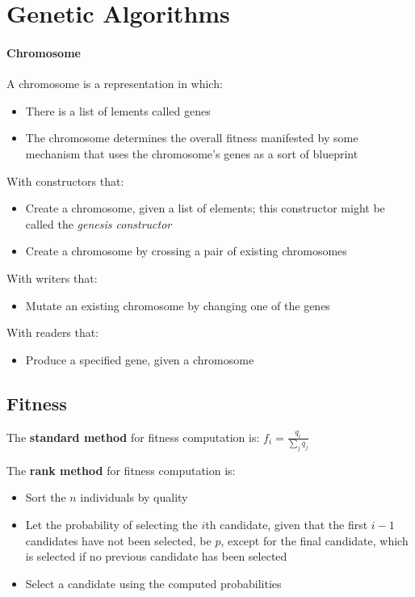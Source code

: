 \section{Genetic Algorithms}

\paragraph{Chromosome} A chromosome is a representation in which:
\begin{itemize}
  \item There is a list of lements called genes
  \item The chromosome determines the overall fitness manifested by
    some mechanism that uses the chromosome's genes as a sort of
    blueprint
\end{itemize}
With constructors that:
\begin{itemize}
  \item Create a chromosome, given a list of elements; this
    constructor might be called the \textit{genesis constructor}
  \item Create a chromosome by crossing a pair of existing
    chromosomes
\end{itemize}
With writers that:
\begin{itemize}
  \item Mutate an existing chromosome by changing one of the genes
\end{itemize}
With readers that:
\begin{itemize}
  \item Produce a specified gene, given a chromosome
\end{itemize}

\subsection{Fitness}

The \textbf{standard method} for fitness computation is:
\begin{math}
  f_i = \frac{q_i}{\sum_{j}{q_j}}
\end{math}

The \textbf{rank method} for fitness computation is:
\begin{itemize}
  \item Sort the $n$ individuals by quality
  \item Let the probability of selecting the $i$th candidate, given
    that the first $i-1$ candidates have not been selected, be $p$,
    except for the final candidate, which is selected if no
    previous candidate has been selected
  \item Select a candidate using the computed probabilities
\end{itemize}

